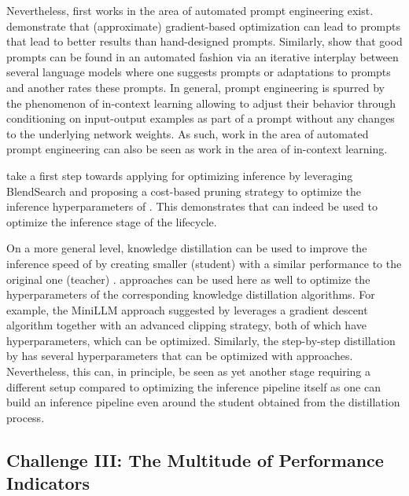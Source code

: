 \documentclass[10pt]{article} %
\begin{document}
Nevertheless, first works in the area of automated prompt engineering exist. \citet{shin-emnlp20a} demonstrate that (approximate) gradient-based optimization can lead to prompts that lead to better results than hand-designed prompts. Similarly, \citet{zhou-iclr23a} show that good prompts can be found in an automated fashion via an iterative interplay between several language models where one \LLM suggests prompts or adaptations to prompts and another \LLM rates these prompts. In general, prompt engineering is spurred by the phenomenon of in-context learning\citep{brown-neurips20a} allowing \LLMs to adjust their behavior through conditioning on input-output examples as part of a prompt without any changes to the underlying network weights. As such, work in the area of automated prompt engineering can also be seen as work in the area of in-context learning.

\citet{wang-arxiv2023a} take a first step towards applying \AutoML for optimizing \LLM inference by leveraging BlendSearch \citep{wang-iclr2021a} and proposing a cost-based pruning strategy to optimize the inference hyperparameters of \LLMs. This demonstrates that \AutoML can indeed be used to optimize the inference stage of the \LLM lifecycle.

On a more general level, knowledge distillation can be used to improve the inference speed of \LLMs by creating smaller (student) \LLMs with a similar performance to the original one (teacher) \citep{gu-arxiv23a,hsieh-acl23a}. \AutoML approaches can be used here as well to optimize the hyperparameters of the corresponding knowledge distillation algorithms. For example, the MiniLLM approach suggested by \citet{gu-arxiv23a} leverages a gradient descent algorithm together with an advanced clipping strategy, both of which have hyperparameters, which can be optimized. Similarly, the step-by-step distillation by \citet{hsieh-acl23a} has several hyperparameters that can be optimized with \AutoML approaches. Nevertheless, this can, in principle, be seen as yet another stage requiring a different \AutoML setup compared to optimizing the inference pipeline itself as one can build an inference pipeline even around the student \LLM obtained from the distillation process.


\subsection{Challenge III: The Multitude of Performance Indicators}
\end{document}
